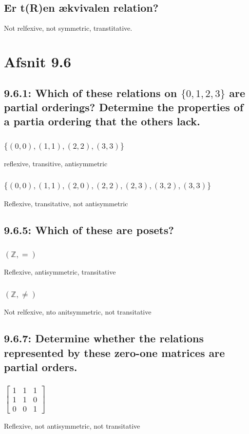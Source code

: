 \documentclass[12pt, a4paper]{report}
\begin{document}
				\subsection{Er t(R)en ækvivalen relation?}
					Not relfexive, not symmetric, transtitative.
			\section{Afsnit 9.6}
				\setcounter{subsection}{0}
				\subsection{9.6.1: Which of these relations on $\{0,1,2,3\}$ are partial orderings? Determine the properties of a partia ordering that the others lack.}
					\subsubsection{$\{(0, 0), (1, 1), (2, 2), (3, 3)\}$}
						reflexive, transitive, antisymmetric
					\subsubsection{$\{(0, 0), (1, 1), (2, 0), (2, 2), (2, 3), (3, 2), (3, 3)\}$}
						Reflexive, transitative, not antisymmetric
				\setcounter{subsection}{4}
				\subsection{9.6.5: Which of these are posets?}
					\subsubsection{$(\mathbb{Z},=)$}
						Reflexive, antisymmetric, transitative
					\subsubsection{$(\mathbb{Z},\neq)$}
						Not relfexive, nto anitsymmetric, not transitative
				\setcounter{subsection}{6}
				\subsection{9.6.7: Determine whether the relations represented by these zero-one matrices are partial orders.}
					\subsubsection{$\begin{bmatrix}
								1 & 1 & 1\\
								1 & 1 & 0\\
								0 & 0 & 1
								\end{bmatrix}$}
						Reflexive, not antisymmetric, not transitative
				\setcounter{subsection}{13}
\end{document}
